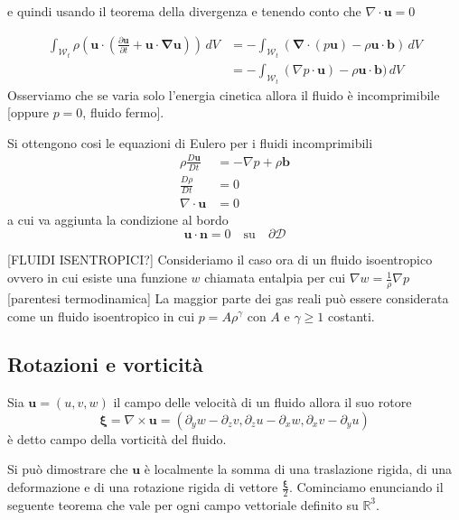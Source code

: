 \documentclass{book}
\newcommand{\Nabla}{\boldsymbol{\nabla}}
\begin{document}
e quindi usando il teorema della divergenza e tenendo conto che $\nabla \cdot \mathbf{u} = 0$

\begin{equation}
\begin{split}
\int_{\mathcal{W}_t} \rho \left ( \mathbf{u} \cdot \left ( \frac{\partial \mathbf{u}}{\partial t} + \mathbf{u} \cdot \Nabla \mathbf{u} \right )\right ) \, dV
 &= - \int_{\mathcal{W}_t} ( \Nabla \cdot (p\mathbf{u}) - \rho \mathbf{u} \cdot \mathbf{b}) \, dV \\
 &=  - \int_{\mathcal{W}_t} ( \nabla p  \cdot \mathbf{u}) - \rho \mathbf{u} \cdot \mathbf{b}) \, dV
\end{split}
\end{equation}
Osserviamo che se varia solo l'energia cinetica allora il fluido è incomprimibile [oppure $p=0$, fluido fermo].
 
Si ottengono cosi le equazioni di Eulero per i fluidi incomprimibili
\begin{equation}
\boxed{
\begin{aligned}
\rho \frac{D\mathbf{u}}{Dt} &= - \nabla p + \rho \mathbf{b} \\
\frac{D \rho }{Dt} &= 0 \\
\nabla \cdot \mathbf{u} &= 0
\end{aligned}
}
\end{equation}
a cui va aggiunta la condizione al bordo 
$$\mathbf{u} \cdot \mathbf{n} = 0 \quad \text{su} \quad \partial \mathcal{D}$$
 
[FLUIDI ISENTROPICI?]
Consideriamo il caso ora di un fluido isoentropico ovvero in cui esiste una funzione $w$ chiamata entalpia per cui
$\nabla w = \frac{1}{\rho} \nabla p$
[parentesi termodinamica]
La maggior parte dei gas reali può essere considerata come un fluido isoentropico in cui $p = A \rho ^ \gamma$ con $A$ e $\gamma \geq 1$ costanti.
 
\subsection{Rotazioni e vorticità}

Sia $\mathbf{u} = (u,v,w)$ il campo delle velocità di un fluido allora il suo rotore 
$$\boldsymbol{\xi} = \nabla \times \mathbf{u} = (\partial_y w - \partial_z v, \partial_z u - \partial_x w, \partial_x v - \partial_y u)$$
è detto campo della vorticità del fluido.

Si può dimostrare che $\mathbf{u}$ è localmente la somma di una traslazione rigida, di una deformazione e di una rotazione rigida di vettore $\frac{\boldsymbol{\xi}}{2}$. Cominciamo enunciando il seguente teorema che vale per ogni campo vettoriale definito su $\mathbb{R}^3$.
\end{document}
